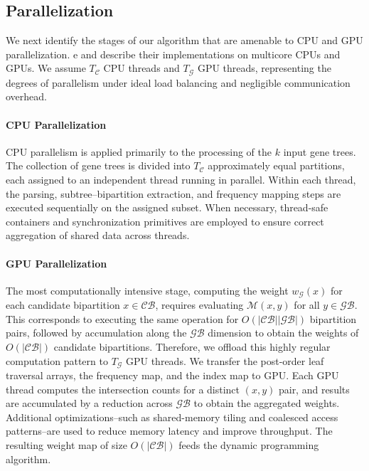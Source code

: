 \documentclass[10pt,a4paper]{article}
\begin{document}

\subsection{Parallelization}
\label{subsec:parallel}


We next identify the stages of our algorithm that are amenable to CPU and GPU parallelization. e and describe their implementations on multicore CPUs and GPUs. We assume $T_\mathcal{C}$ CPU threads and $T_\mathcal{G}$ GPU threads, representing the degrees of parallelism under ideal load balancing and negligible communication overhead. %

\paragraph{CPU Parallelization}

CPU parallelism is applied primarily to the processing of the $k$ input gene trees. The collection of gene trees is divided into $T_\mathcal{C}$ approximately equal partitions, each assigned to an independent thread running in parallel. Within each thread, the parsing, subtree–bipartition extraction, and frequency mapping steps are executed sequentially on the assigned subset. When necessary, thread-safe containers and synchronization primitives are employed to ensure correct aggregation of shared data across threads.

\paragraph{GPU Parallelization}

The most computationally intensive stage, computing the weight $w_{\mathcal{G}}(x)$ for each candidate bipartition $x \in \mathcal{CB}$, requires evaluating $\mathcal{M}(x,y)$ for all $y \in \mathcal{GB}$. This corresponds to executing the same operation for $O(|\mathcal{CB}||\mathcal{GB}|)$ bipartition pairs, followed by accumulation along the $\mathcal{GB}$ dimension to obtain the weights of $O(|\mathcal{CB}|)$ candidate bipartitions. Therefore, we offload this highly regular computation pattern to $T_\mathcal{G}$ GPU threads. We transfer the post-order leaf traversal arrays, the frequency map, and the index map to GPU. Each GPU thread computes the intersection counts for a distinct $(x,y)$ pair, and results are accumulated by a reduction across $\mathcal{GB}$ to obtain the aggregated weights. Additional optimizations--such as shared-memory tiling and coalesced access patterns--are used to reduce memory latency and improve throughput.   The resulting weight map of size $O(|\mathcal{CB}|)$ feeds the dynamic programming algorithm.
\end{document}
